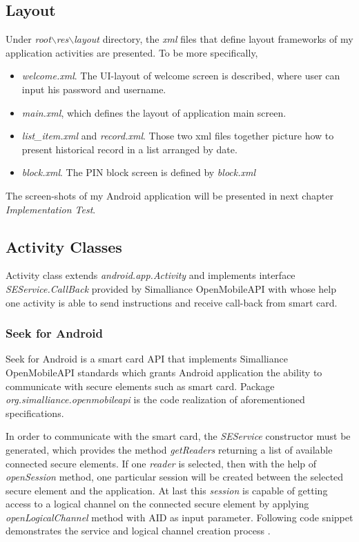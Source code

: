 \subsection{Layout} \label{secLayout}
Under \emph{root$\backslash$res$\backslash$layout} directory, the \emph{xml} files that define layout frameworks of my application activities are presented. To be more specifically,
\begin{itemize}
\item \emph{welcome.xml}. The UI-layout of welcome screen is described, where user can input his password and username.
\item \emph{main.xml}, which defines the layout of application main screen.
\item \emph{list\_item.xml} and \emph{record.xml}. Those two xml files together picture how to present historical record in a list arranged by date.
\item \emph{block.xml}. The PIN block screen is defined by \emph{block.xml}
\end{itemize}
The screen-shots of my Android application will be presented in next chapter \emph{Implementation Test}.


\subsection{Activity Classes}
Activity class extends \emph{android.app.Activity} and implements interface \emph{SEService.CallBack} provided by Simalliance OpenMobileAPI with whose help one activity is able to send instructions and receive call-back from smart card. 
\subsubsection{Seek for Android} \label{secSFA}
Seek for Android is a smart card API that implements Simalliance OpenMobileAPI standards which grants Android application the ability to communicate with secure elements such as smart card. Package \emph{org.simalliance.openmobileapi} is the code realization of aforementioned specifications.

In order to communicate with the smart card, the \emph{SEService} constructor must be generated, which provides the method \emph{getReaders} returning a list of available connected secure elements. If one \emph{reader} is selected, then with the help of \emph{openSession} method, one particular session will be created between the selected secure element and the application. At last this \emph{session} is capable of getting access to a logical channel on the connected secure element by applying \emph{openLogicalChannel} method with AID as input parameter. Following code snippet demonstrates the service and logical channel creation process \cite{open}.

